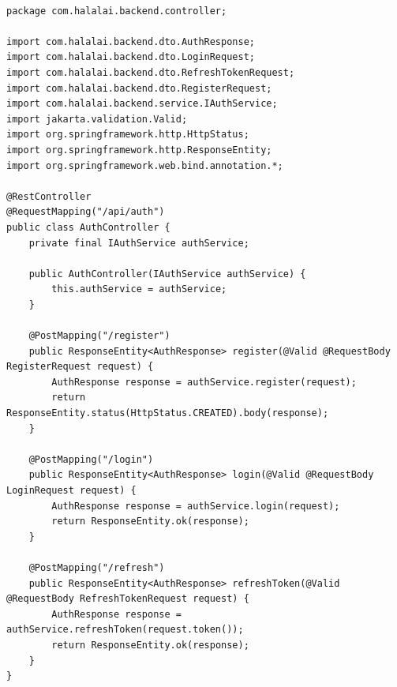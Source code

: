 \begin{lstlisting}[basicstyle=\tiny\ttfamily,breaklines=true]

package com.halalai.backend.controller;

import com.halalai.backend.dto.AuthResponse;
import com.halalai.backend.dto.LoginRequest;
import com.halalai.backend.dto.RefreshTokenRequest;
import com.halalai.backend.dto.RegisterRequest;
import com.halalai.backend.service.IAuthService;
import jakarta.validation.Valid;
import org.springframework.http.HttpStatus;
import org.springframework.http.ResponseEntity;
import org.springframework.web.bind.annotation.*;

@RestController
@RequestMapping("/api/auth")
public class AuthController {
    private final IAuthService authService;

    public AuthController(IAuthService authService) {
        this.authService = authService;
    }

    @PostMapping("/register")
    public ResponseEntity<AuthResponse> register(@Valid @RequestBody RegisterRequest request) {
        AuthResponse response = authService.register(request);
        return ResponseEntity.status(HttpStatus.CREATED).body(response);
    }

    @PostMapping("/login")
    public ResponseEntity<AuthResponse> login(@Valid @RequestBody LoginRequest request) {
        AuthResponse response = authService.login(request);
        return ResponseEntity.ok(response);
    }

    @PostMapping("/refresh")
    public ResponseEntity<AuthResponse> refreshToken(@Valid @RequestBody RefreshTokenRequest request) {
        AuthResponse response = authService.refreshToken(request.token());
        return ResponseEntity.ok(response);
    }
}
\end{lstlisting}

